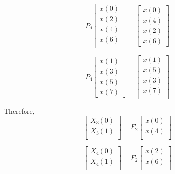 \documentclass[journal,12pt,twocolumn]{IEEEtran}
\renewcommand\thesection{\arabic{section}}
\begin{document}
\begin{enumerate}[label=\thesection.\arabic*]
\begin{equation}
P_{4}
\begin{bmatrix}
x(0) \\ 
x(2) \\ 
x(4) \\ 
x(6) \\
\end{bmatrix}
 = 
\begin{bmatrix}
x(0) \\ 
x(4) \\ 
x(2) \\
x(6)
\end{bmatrix}
\end{equation}

\begin{equation}
P_{4}
\begin{bmatrix}
x(1) \\ 
x(3) \\ 
x(5) \\
x(7)
\end{bmatrix}
 = 
\begin{bmatrix}
x(1) \\ 
x(5) \\ 
x(3) \\ 
x(7) \\
\end{bmatrix}
\end{equation}

Therefore,
\begin{equation}
\begin{bmatrix}
X_{3}(0) \\ 
X_{3}(1)\\ 
\end{bmatrix}
= F_{2}
\begin{bmatrix}
x(0) \\ 
x(4) \\ 
\end{bmatrix}
\end{equation}

\begin{equation}
\begin{bmatrix}
X_{4}(0) \\ 
X_{4}(1)\\ 
\end{bmatrix}
= F_{2}
\begin{bmatrix}
x(2) \\ 
x(6) \\ 
\end{bmatrix}
\end{equation}


\end{enumerate}
\end{document}
